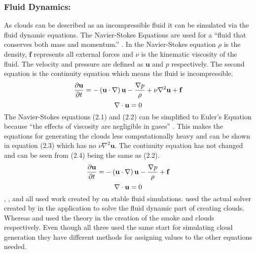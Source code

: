 \subsubsection{Fluid Dynamics:}
\label{sec:fd}
As clouds can be described as an incompressible fluid it can be simulated via the fluid dynamic equations.
The Navier-Stokes Equations are used for a “fluid that conserves both mass and momentum.” \citep{JStam99}.
In the Navier-Stokes equation $\rho$ is the density, $\mathbf{f}$ represents all external forces and $\nu$ is the kinematic viscosity of the fluid.
The velocity and pressure are defined as $\mathbf{u}$ and $p$ respectively.
The second equation is the continuity equation which means the fluid is incompressible.
\begin{equation} \label{eq:Navier-Stokes}
  \centering
  \frac{\partial \mathbf{u}}{\partial t}=-\left(\mathbf{u}\cdot \nabla \right)\mathbf{u}-\frac{\nabla p}{\rho}+\nu{\nabla }^{2}\mathbf{u}+\mathbf{f}
\end{equation}
\begin{equation} \label{eq:Continuity Equation}
  \centering
  \nabla\cdot\mathbf{u}=0
\end{equation}
The Navier-Stokes equations (2.1) and (2.2) can be simplified to Euler's Equation because “the effects of viscosity are negligible in gases” \citep*{Fedkiw01}.
This makes the equations for generating the clouds less computationally heavy and can be shown in equation (2.3) which has no $\nu{\nabla }^{2}\mathbf{u}$.
The continuity equation has not changed and can be seen from (2.4) being the same as (2.2).
\begin{equation} \label{eq:Euler's Equation}
  \centering
   \frac{\partial \mathbf{u}}{\partial t}=-\left(\mathbf{u}\cdot \nabla \right)\mathbf{u}-\frac{\nabla p}{\rho}+\mathbf{f}
\end{equation}
\begin{equation} \label{eq:Continuity Equation Euler}
  \centering
  \nabla\cdot\mathbf{u}=0
\end{equation}
\citet*{Fedkiw01}, \citet{HarrisEtAl03}, and \citet*{DOverby02} all used work created by \citet{JStam99} on stable fluid simulations.
\citet*{DOverby02} used the actual solver created by \citet{JStam99} in the application to solve the fluid dynamic part of creating clouds.
Whereas \citet*{Fedkiw01} and \citet{HarrisEtAl03} used the theory in the creation of the smoke and clouds respectively.
Even though all three used the same start for simulating cloud generation they have different methods for assigning values to the other equations needed. 

